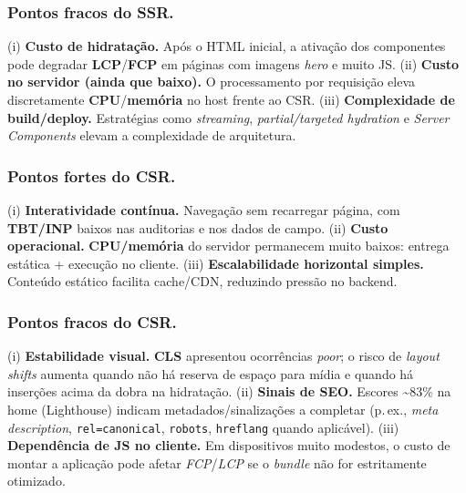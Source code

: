 \subsubsection{Pontos fracos do SSR.}
(i) \textbf{Custo de hidratação.} Após o HTML inicial, a ativação dos componentes pode degradar \textbf{LCP}/\textbf{FCP} em páginas com imagens \emph{hero} e muito JS.  
(ii) \textbf{Custo no servidor (ainda que baixo).} O processamento por requisição eleva discretamente \textbf{CPU}/\textbf{memória} no host frente ao CSR.  
(iii) \textbf{Complexidade de build/deploy.} Estratégias como \emph{streaming}, \emph{partial/targeted hydration} e \emph{Server Components} elevam a complexidade de arquitetura.

\subsubsection{Pontos fortes do CSR.}
(i) \textbf{Interatividade contínua.} Navegação sem recarregar página, com \textbf{TBT/INP} baixos nas auditorias e nos dados de campo.  
(ii) \textbf{Custo operacional.} \textbf{CPU/memória} do servidor permanecem muito baixos: entrega estática + execução no cliente.  
(iii) \textbf{Escalabilidade horizontal simples.} Conteúdo estático facilita cache/CDN, reduzindo pressão no backend.

\subsubsection{Pontos fracos do CSR.}
(i) \textbf{Estabilidade visual.} \textbf{CLS} apresentou ocorrências \textit{poor}; o risco de \emph{layout shifts} aumenta quando não há reserva de espaço para mídia e quando há inserções acima da dobra na hidratação.  
(ii) \textbf{Sinais de SEO.} Escores \textasciitilde83\% na home (Lighthouse) indicam metadados/sinalizações a completar (p.\,ex., \emph{meta description}, \texttt{rel=canonical}, \texttt{robots}, \texttt{hreflang} quando aplicável).  
(iii) \textbf{Dependência de JS no cliente.} Em dispositivos muito modestos, o custo de montar a aplicação pode afetar \textit{FCP}/\textit{LCP} se o \emph{bundle} não for estritamente otimizado.


